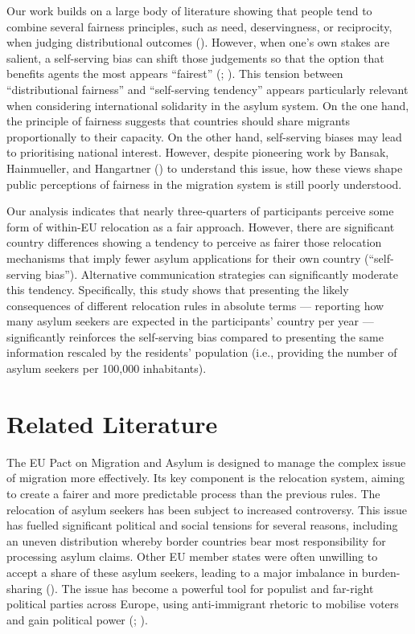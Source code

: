 \documentclass[
  12pt,
  a4paper,
]{article}
\begin{document}
Our work builds on a large body of literature showing that people tend to combine several fairness principles, such as need, deservingness, or reciprocity, when judging distributional outcomes (). However, when one's own stakes are salient, a self-serving bias can shift those judgements so that the option that benefits agents the most appears ``fairest'' (; ). This tension between ``distributional fairness'' and ``self-serving tendency'' appears particularly relevant when considering international solidarity in the asylum system. On the one hand, the principle of fairness suggests that countries should share migrants proportionally to their capacity. On the other hand, self-serving biases may lead to prioritising national interest. However, despite pioneering work by Bansak, Hainmueller, and Hangartner () to understand this issue, how these views shape public perceptions of fairness in the migration system is still poorly understood.

Our analysis indicates that nearly three-quarters of participants perceive some form of within-EU relocation as a fair approach. However, there are significant country differences showing a tendency to perceive as fairer those relocation mechanisms that imply fewer asylum applications for their own country (``self-serving bias''). Alternative communication strategies can significantly moderate this tendency. Specifically, this study shows that presenting the likely consequences of different relocation rules in absolute terms --- reporting how many asylum seekers are expected in the participants' country per year --- significantly reinforces the self-serving bias compared to presenting the same information rescaled by the residents' population (i.e., providing the number of asylum seekers per 100,000 inhabitants).

\section{Related Literature}\label{related-literature}

The EU Pact on Migration and Asylum is designed to manage the complex issue of migration more effectively. Its key component is the relocation system, aiming to create a fairer and more predictable process than the previous rules. The relocation of asylum seekers has been subject to increased controversy. This issue has fuelled significant political and social tensions for several reasons, including an uneven distribution whereby border countries bear most responsibility for processing asylum claims. Other EU member states were often unwilling to accept a share of these asylum seekers, leading to a major imbalance in burden-sharing (). The issue has become a powerful tool for populist and far-right political parties across Europe, using anti-immigrant rhetoric to mobilise voters and gain political power (; ).
\end{document}
